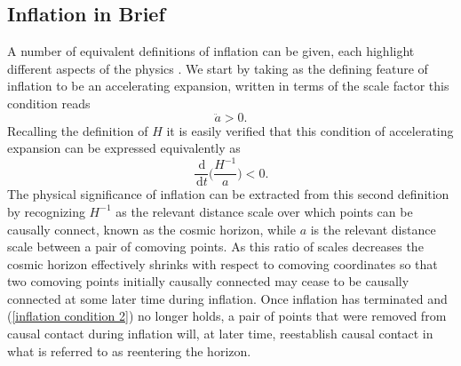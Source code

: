 \documentclass[letterpaper,11pt]{article}
\newcommand{\ud}{\,\mathrm{d}}
\begin{document}



\subsection{Inflation in Brief}
A number of equivalent definitions of inflation can be given, each highlight different aspects of the physics \cite{liddle}. We start by taking as the defining feature of inflation to be an accelerating expansion, written in terms of the scale factor this condition reads
\begin{equation}
\ddot{a}>0.
\end{equation}
Recalling the definition of $H$ it is easily verified that this condition of accelerating expansion can be expressed equivalently as
\begin{equation}
\frac{\ud}{\ud t}\bigg(\frac{H^{-1}}{a}\bigg)<0. \label{inflation condition 2}
\end{equation}
The physical significance of inflation can be extracted from this second definition by recognizing $H^{-1}$ as the relevant distance scale over which points can be causally connect, known as the cosmic horizon, while $a$ is the relevant distance scale between a pair of comoving points. As this ratio of scales decreases the cosmic horizon effectively shrinks with respect to comoving coordinates so that two comoving points initially causally connected may cease to be causally connected at some later time during inflation. Once inflation has terminated and (\ref{inflation condition 2}) no longer holds, a pair of points that were removed from causal contact during inflation will, at later time, reestablish causal contact in what is referred to as reentering the horizon.

\end{document}
